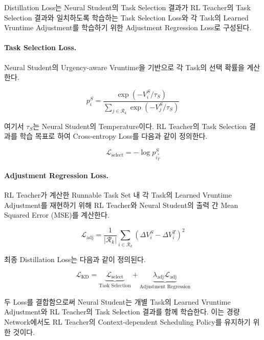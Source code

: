 Distillation Loss는 Neural Student의 Task Selection 결과가 RL Teacher의
Task Selection 결과와 일치하도록 학습하는 Task Selection Loss와
각 Task의 Learned Vruntime Adjustment를 학습하기 위한
Adjustment Regression Loss로 구성된다.

\paragraph{Task Selection Loss.}
Neural Student의 Urgency-aware Vruntime을 기반으로
각 Task의 선택 확률을 계산한다.

\begin{equation}
    p_i^S =
    \frac{
        \exp(-V_i^S/\tau_S)
    }{
        \sum_{j\in\mathcal{R}_k}\exp(-V_j^S/\tau_S)
    }
\end{equation}

여기서 $\tau_S$는 Neural Student의 Temperature이다.
RL Teacher의 Task Selection 결과를 학습 목표로 하여
Cross-entropy Loss를 다음과 같이 정의한다.

\begin{equation}
    \mathcal{L}_{\mathrm{select}}
    =
    -\log p_{i_T^*}^S
\end{equation}

\paragraph{Adjustment Regression Loss.}
RL Teacher가 계산한 Runnable Task Set 내 각 Task의
Learned Vruntime Adjustment를 재현하기 위해
RL Teacher와 Neural Student의 출력 간 Mean Squared Error
(MSE)를 계산한다.

\begin{equation}
    \mathcal{L}_{\mathrm{adj}}
    =
    \frac{1}{|\mathcal{R}_k|}
    \sum_{i\in\mathcal{R}_k}
    \left(
        \Delta V_i^S-\Delta V_i^T
    \right)^2
\end{equation}

최종 Distillation Loss는 다음과 같이 정의된다.

\begin{equation}
    \mathcal{L}_{\mathrm{KD}}
    =
    \underbrace{\mathcal{L}_{\mathrm{select}}}
        _{\text{Task Selection}}
    +
    \underbrace{\lambda_{\mathrm{adj}}
        \mathcal{L}_{\mathrm{adj}}}
        _{\text{Adjustment Regression}}
    \label{eq:distillation_loss}
\end{equation}

두 Loss를 결합함으로써 Neural Student는 개별 Task의 Learned Vruntime Adjustment와 RL Teacher의 Task Selection 결과를 함께 학습한다. 이는 경량 Network에서도 RL Teacher의 Context-dependent Scheduling Policy를 유지하기 위한 것이다.
